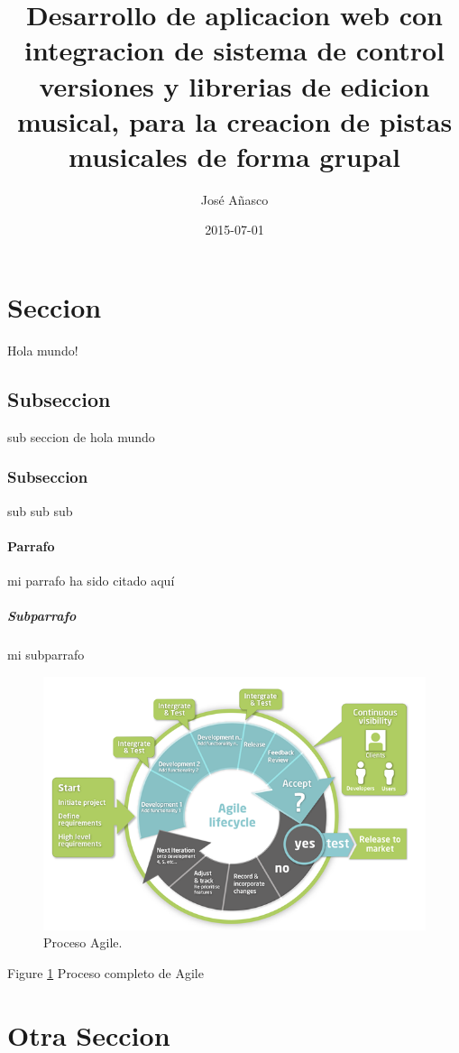 \documentclass{article}
\title{Desarrollo de aplicacion web con integracion de sistema de control versiones
  y librerias de edicion musical, para la creacion de pistas musicales de forma
  grupal}
\date{2015-07-01}
\author{Jos\'e A\~nasco}
\begin{document}
  \maketitle

  \newpage
  \thispagestyle{empty}
  \tableofcontents

  \newpage

  \section{Seccion}

  Hola mundo!

  \subsection{Subseccion}

  sub seccion de hola mundo

  \subsubsection{Subseccion}

  sub sub sub

  \paragraph{Parrafo}

  mi parrafo
  \cite{LIBROBENITO1} ha sido citado aqu\'i

  \subparagraph{Subparrafo}

  mi subparrafo

    \begin{figure}[!h]
      \includegraphics[width=\linewidth]{agile.png}
      \caption{Proceso Agile.}
      \label{fig:agile1}
    \end{figure}

    Figure \ref{fig:agile1} Proceso completo de Agile

  \newpage
  \section{Otra Seccion}


  \newpage
  \begin{appendix}
    \listoffigures
    
    
  \end{appendix}
\end{document}
